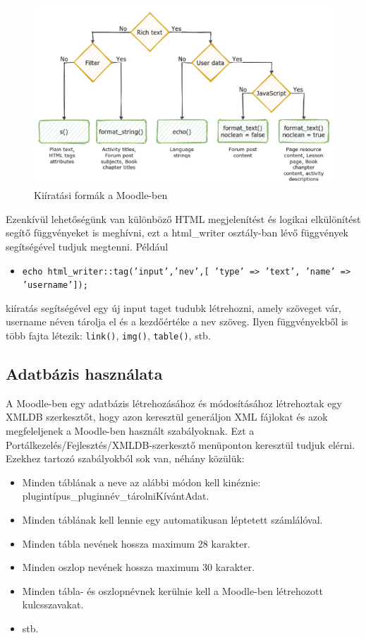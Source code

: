 \begin{figure}
    \centering
    \includegraphics[scale=0.9]{Fejezetek/Images/print.png}
    \caption{Kiíratási formák a Moodle-ben \cite{MoodleTutorial}}
\end{figure}

Ezenkívül lehetőségünk van különböző HTML megjelenítést és logikai elkülönítést segítő függvényeket is meghívni, ezt a html\_writer osztály-ban lévő függvények segítségével tudjuk megtenni. Például
\begin{itemize}
    \item[] \texttt{echo html\_writer::tag('input','nev',[ 'type' => 'text', 'name' => 'username']);} 
\end{itemize}
kiíratás segítségével egy új input taget tudubk létrehozni, amely szöveget vár, username néven tárolja el és a kezdőértéke a nev szöveg. Ilyen függvényekből is több fajta létezik: \texttt{link()}, \texttt{img()}, \texttt{table()}, stb.

\subsection{Adatbázis használata}

A Moodle-ben egy adatbázis létrehozásához és módosításához létrehoztak egy XMLDB szerkesztőt, hogy azon keresztül generáljon XML fájlokat és azok megfeleljenek a Moodle-ben használt szabályoknak. Ezt a Portálkezelés/Fejlesztés/XMLDB-szerkesztő menüponton keresztül tudjuk elérni. Ezekhez tartozó szabályokból sok van, néhány közülük:

\begin{itemize}
    \item Minden táblának a neve az alábbi módon kell kinéznie: \hfill \break plugintípus\_pluginnév\_tárolniKívántAdat.
    \item Minden táblának kell lennie egy automatikusan léptetett számlálóval.
    \item Minden tábla nevének hossza maximum 28 karakter.
    \item Minden oszlop nevének hossza maximum 30 karakter.
    \item Minden tábla- és oszlopnévnek kerülnie kell a Moodle-ben létrehozott kulcsszavakat.
    \item stb.
\end{itemize}

